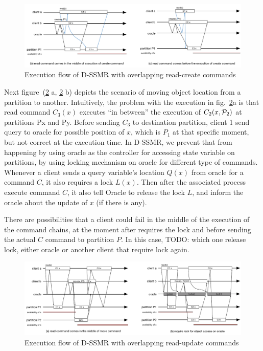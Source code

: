 \begin{figure}
\begin{minipage}[b]{1.0\linewidth} %
\centering
      \includegraphics[width=1\linewidth]{figures/read_overlap}
\end{minipage}
\caption{Execution flow of D-SSMR with overlapping read-create commands}
\label{fig:readoverlap}
\end{figure}


Next figure~(\ref{fig:updateoverlap} a, \ref{fig:updateoverlap} b) depicts the scenario of moving object location from a partition to another. Intuitively, the problem with the execution in fig.~\ref{fig:updateoverlap}a is that read command $C_3(x)$ executes “in between” the execution of $C_2(x,\mathcal{P}_2)$ at partitions Px and Py. Before sending $C_3$ to destination partition, client 1 send query to oracle for possible position of $x$, which is $P_1$ at that specific moment, but not correct at the execution time. In D-SSMR, we prevent that from happening by using oracle as the controller for accessing state variable on partitions, by using locking mechanism on oracle for different type of commands. Whenever a client sends a query variable's location $Q(x)$ from oracle for a command $C$, it also requires a lock $L(x)$. Then after the associated process execute command $C$, it also tell Oracle to release the lock $L$, and inform the oracle about the update of $x$ (if there is any).

There are possibilities that a client could fail in the middle of the execution of the command chains, at the moment after requires the lock and before sending the actual $C$ command to partition $P$. In this case, TODO: which one release lock, either oracle or another client that require lock again. 

\begin{figure}
\begin{minipage}[b]{1.0\linewidth} %
\centering
      \includegraphics[width=1\linewidth]{figures/update_overlap}
\end{minipage}
\caption{Execution flow of D-SSMR with overlapping read-update commands}
\label{fig:updateoverlap}
\end{figure}


